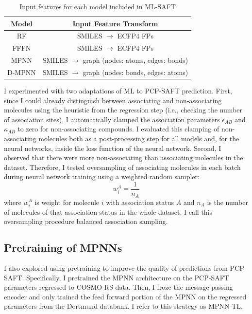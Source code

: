 \begin{table}[t]
    \centering
    \caption{Input features for each model included in ML-SAFT}
    \begin{tabular}{cc}
         Model & Input Feature Transform \\
         \hline
         RF & SMILES $\rightarrow$ ECFP4 FPs \\
         FFFN & SMILES $\rightarrow$  ECFP4 FPs \\
         MPNN & SMILES $\rightarrow$  graph (nodes: atoms, edges: bonds) \\
         D-MPNN & SMILES $\rightarrow$  graph (nodes: bonds, edges: atoms) \\
    \end{tabular}
    \label{tab:model_features}
\end{table}

I experimented with two adaptations of ML to PCP-SAFT prediction. First, since I could already distinguish between associating and non-associating molecules using the heuristic from the regression step (i.e., checking the number of association sites), I automatically clamped the association parameters $\epsilon_{AB}$ and $\kappa_{AB}$ to zero for non-associating compounds. I evaluated this clamping of non-associating molecules both as a post-processing step for all models and, for the neural networks, inside the loss function of the neural network. Second, I observed that there were more non-associating than associating molecules in the dataset. Therefore, I tested oversampling of associating molecules in each batch during neural network training using a weighted random sampler:
\begin{equation}
    w_i^{A} = \frac{1}{n_A}
\end{equation}
where $w_i^{A}$ is weight for molecule $i$ with association status $A$ and $n_A$ is the number of molecules of that association status in the whole dataset. I call this oversampling procedure balanced association sampling.

\subsection{Pretraining of MPNNs}

I also explored using pretraining to improve the quality of predictions from PCP-SAFT. Specifically, I pretrained the MPNN architecture on the PCP-SAFT parameters regressed to COSMO-RS data. Then, I froze the message passing encoder and only trained the feed forward portion of the MPNN on the regressed parameters from the Dortmund databank. I refer to this strategy as MPNN-TL.

